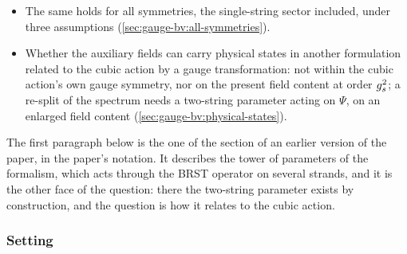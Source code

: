 \begin{itemize}

  \item The same holds for all symmetries, the single-string sector included, under three assumptions (\cref{sec:gauge-bv:all-symmetries}).


  \item Whether the auxiliary fields can carry physical states in another formulation related to the cubic action by a gauge transformation: not within the cubic action's own gauge symmetry, nor on the present field content at order $g_s^2$; a re-split of the spectrum needs a two-string parameter acting on $\Psi$, on an enlarged field content (\cref{sec:gauge-bv:physical-states}).

\end{itemize}

The first paragraph below is the one of the \IBL{} section of an earlier version of the paper, in the paper's notation.
It describes the tower of parameters of the \IBL{} formalism, which acts through the BRST operator on several strands, and it is the other face of the question: there the two-string parameter exists by construction, and the question is how it relates to the cubic action.



\subsubsection{Setting}
\label{sec:gauge-bv:setting}


